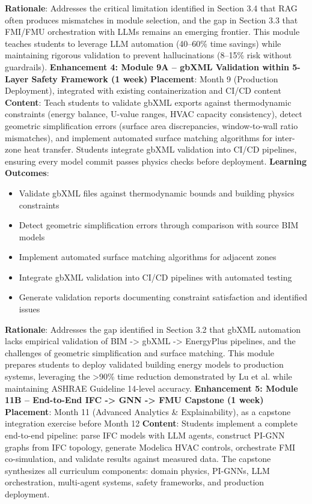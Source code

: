 \documentclass[12pt,a4paper]{article}
\begin{document}
\textbf{Rationale}: Addresses the critical limitation identified in Section 3.4 that RAG often produces mismatches in module selection, and the gap in Section 3.3 that FMI/FMU orchestration with LLMs remains an emerging frontier. This module teaches students to leverage LLM automation (40--60\% time savings) while maintaining rigorous validation to prevent hallucinations (8--15\% risk without guardrails).
\textbf{Enhancement 4: Module 9A -- gbXML Validation within 5-Layer Safety Framework (1 week)}
\textbf{Placement}: Month 9 (Production Deployment), integrated with existing containerization and CI/CD content
\textbf{Content}: Teach students to validate gbXML exports against thermodynamic constraints (energy balance, U-value ranges, HVAC capacity consistency), detect geometric simplification errors (surface area discrepancies, window-to-wall ratio mismatches), and implement automated surface matching algorithms for inter-zone heat transfer. Students integrate gbXML validation into CI/CD pipelines, ensuring every model commit passes physics checks before deployment.
\textbf{Learning Outcomes}:
\begin{itemize}
  \item Validate gbXML files against thermodynamic bounds and building physics constraints
  \item Detect geometric simplification errors through comparison with source BIM models
  \item Implement automated surface matching algorithms for adjacent zones
  \item Integrate gbXML validation into CI/CD pipelines with automated testing
  \item Generate validation reports documenting constraint satisfaction and identified issues
\end{itemize}
\textbf{Rationale}: Addresses the gap identified in Section 3.2 that gbXML automation lacks empirical validation of BIM -> gbXML -> EnergyPlus pipelines, and the challenges of geometric simplification and surface matching. This module prepares students to deploy validated building energy models to production systems, leveraging the >90\% time reduction demonstrated by Lu et al. while maintaining ASHRAE Guideline 14-level accuracy.
\textbf{Enhancement 5: Module 11B -- End-to-End IFC -> GNN -> FMU Capstone (1 week)}
\textbf{Placement}: Month 11 (Advanced Analytics \& Explainability), as a capstone integration exercise before Month 12
\textbf{Content}: Students implement a complete end-to-end pipeline: parse IFC models with LLM agents, construct PI-GNN graphs from IFC topology, generate Modelica HVAC controls, orchestrate FMI co-simulation, and validate results against measured data. The capstone synthesizes all curriculum components: domain physics, PI-GNNs, LLM orchestration, multi-agent systems, safety frameworks, and production deployment.
\end{document}
